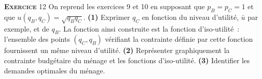 \documentclass[10pt,a4paper,notitlepage]{article}
\newcommand{\exercice}[1]{\textsc{\textbf{Exercice}} #1}
\begin{document}
\exercice{12} On reprend les exercices 9 et 10 en supposant que $p_B =
p_C = 1$ et que $u(q_B, q_C) = \sqrt{q_Bq_C}$. \textbf{(1)} Exprimer
$q_C$ en fonction du niveau d'utilité, $\bar u$ par exemple, et de
$q_B$. La fonction ainsi construite est la fonction d'iso-utilité :
l'ensemble des points $(q_C,q_B)$ vérifiant la contrainte définie par
cette fonction fournissent un même niveau d'utilité. \textbf{(2)}
Représenter graphiquement la contrainte budgétaire du ménage et les
fonctions d'iso-utilité. \textbf{(3)} Identifier les demandes optimales
du ménage.
\end{document}
